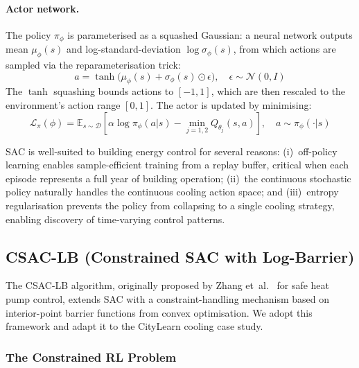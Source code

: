 \paragraph{Actor network.}
The policy $\pi_\phi$ is parameterised as a squashed Gaussian: a neural
network outputs mean $\mu_\phi(s)$ and log-standard-deviation
$\log\sigma_\phi(s)$, from which actions are sampled via the reparameterisation
trick:
\begin{equation}
  a = \tanh\!\bigl(\mu_\phi(s) + \sigma_\phi(s) \odot \epsilon\bigr),
  \quad \epsilon \sim \mathcal{N}(0, I)
  \label{eq:sac-reparameterisation}
\end{equation}
The $\tanh$ squashing bounds actions to $[-1, 1]$, which are then rescaled
to the environment's action range $[0, 1]$.  The actor is updated by
minimising:
\begin{equation}
  \mathcal{L}_\pi(\phi) = \mathbb{E}_{s \sim \mathcal{D}}\!\left[
    \alpha \log \pi_\phi(a|s)
    - \min_{j=1,2} Q_{\theta_j}(s, a)
  \right], \quad a \sim \pi_\phi(\cdot|s)
  \label{eq:sac-actor-loss}
\end{equation}

SAC is well-suited to building energy control for several reasons:
(i)~off-policy learning enables sample-efficient training from a replay buffer,
critical when each episode represents a full year of building operation;
(ii)~the continuous stochastic policy naturally handles the continuous cooling
action space; and
(iii)~entropy regularisation prevents the policy from collapsing to a single
cooling strategy, enabling discovery of time-varying control patterns.

\subsection{CSAC-LB (Constrained SAC with Log-Barrier)}
\label{sec:temp-csac}

The CSAC-LB algorithm, originally proposed by Zhang
et~al.~\cite{zhang2024csaclb} for safe heat pump control, extends SAC with a
constraint-handling mechanism based on interior-point barrier functions from
convex optimisation.  We adopt this framework and adapt it to the CityLearn
cooling case study.

\subsubsection{The Constrained RL Problem}

